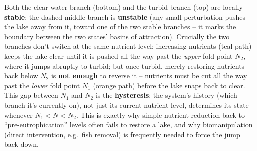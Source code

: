 \documentclass[11pt,a4paper]{article}
\begin{document}
\begin{figbox}[title={Alternative stable states and hysteresis in shallow lakes (Scheffer et al.\ 2001)}]
\vspace{1mm}
\footnotesize Both the clear-water branch (bottom) and the turbid branch (top) are locally \textbf{stable}; the dashed middle branch is \textbf{unstable} (any small perturbation pushes the lake away from it, toward one of the two stable branches -- it marks the boundary between the two states' basins of attraction). Crucially the two branches don't switch at the same nutrient level: increasing nutrients (teal path) keeps the lake clear until it is pushed all the way past the \emph{upper} fold point $N_2$, where it jumps abruptly to turbid; but once turbid, merely restoring nutrients back below $N_2$ is \textbf{not enough} to reverse it -- nutrients must be cut all the way past the \emph{lower} fold point $N_1$ (orange path) before the lake snaps back to clear. This gap between $N_1$ and $N_2$ is the \textbf{hysteresis}: the system's history (which branch it's currently on), not just its current nutrient level, determines its state whenever $N_1 < N < N_2$. This is exactly why simple nutrient reduction back to ``pre-eutrophication'' levels often fails to restore a lake, and why biomanipulation (direct intervention, e.g.\ fish removal) is frequently needed to force the jump back down.
\end{figbox}
\end{document}
